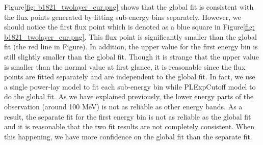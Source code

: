 \documentclass[12pt]{report}
\begin{document}
            Figure\ref{fig: b1821_twolayer_cur.png} shows that the global fit is consistent with 
            the flux points generated by fitting sub-energy bins separately. However, 
            we should notice the first flux point 
            which is denoted as a blue square in Figure\ref{fig: b1821_twolayer_cur.png}. This 
            flux point is significantly smaller than the global fit (the red line in Figure). 
            In addition, the upper value for the first energy bin is still slightly smaller than the global fit. 
            Though it is strange that the upper value is smaller than the normal value at first glance, 
            it is reasonable since the flux points are fitted separately and are independent to 
            the global fit. In fact, we use a single power-lay model to fit each sub-energy bin while PLExpCutoff
            model to do the global fit. As we have explained previously, the lower energy parts of the 
            observation (around 100 MeV) is not as reliable as other energy bands. As a result, the separate 
            fit for the first energy bin
            is not as reliable as the global fit and it is reasonable that the two fit results are not completely
            consistent. When this happening, we have more confidence on the global fit than the separate fit.
            
\end{document}
